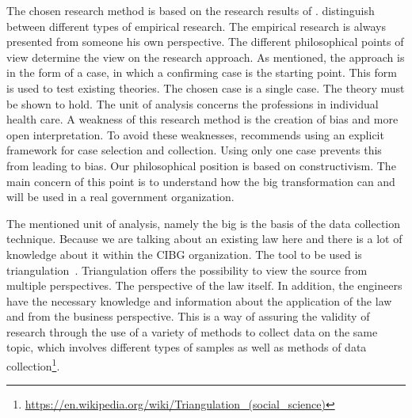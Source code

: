 The chosen research method is based on the research results of \cite{Easterbrook}.
\cite{Easterbrook} distinguish between different types of empirical research. 
The empirical research is always presented from someone his own perspective. 
The different philosophical points of view determine the view on the research approach. 
As mentioned, the approach is in the form of a case, in which a confirming case is the starting point. 
This form is used to test existing theories. 
The chosen case is a single case. 
The theory must be shown to hold. 
The unit of analysis concerns the professions in individual health care. 
A weakness of this research method is the creation of bias and more open interpretation.
To avoid these weaknesses, \cite{Easterbrook} recommends using an explicit framework for case selection and collection.
Using only one case prevents this from leading to bias.
Our philosophical position is based on constructivism.
The main concern of this point is to understand how the \acrfull{big} transformation can and will be used in a real government organization.

The mentioned unit of analysis, namely the \acrfull{big} is the basis of the data collection technique.
Because we are talking about an existing law here and there is a lot of knowledge about it within the CIBG organization.
The tool to be used is triangulation~\citep{carter_use_2014, farquhar_triangulation_2020, runeson_guidelines_2008}.
Triangulation offers the possibility to view the source from multiple perspectives.
The perspective of the law itself.
In addition, the engineers have the necessary knowledge and information about the application of the law and from the business perspective.
This is a way of assuring the validity of research through the use of a variety of methods to collect data on the same topic, which involves different types of samples as well as methods of data collection\footnote{\url{https://en.wikipedia.org/wiki/Triangulation_(social_science)}}.


